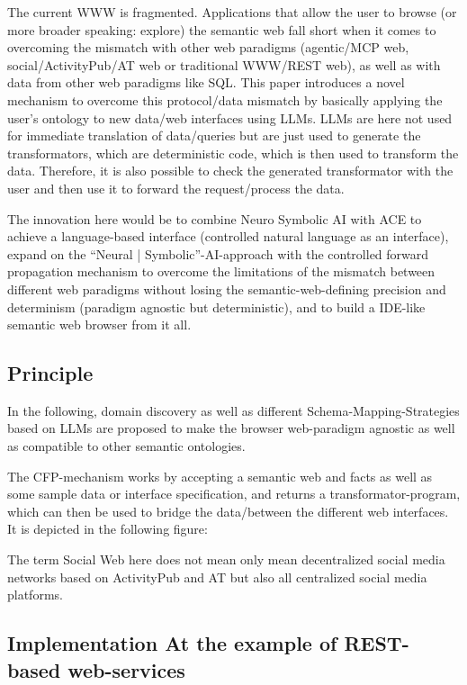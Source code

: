 \documentclass[12pt,a4paper]{article}
\begin{document}
The current WWW is fragmented. Applications that allow the user to browse (or more broader speaking: explore) the semantic web fall short when it comes to overcoming the mismatch with other web paradigms (agentic/MCP web, social/ActivityPub/AT web or traditional WWW/REST web), as well as with data from other web paradigms like SQL. This paper introduces a novel mechanism to overcome this protocol/data mismatch by basically applying the user's ontology to new data/web interfaces using LLMs. LLMs are here not used for immediate translation of data/queries but are just used to generate the transformators, which are deterministic code, which is then used to transform the data. Therefore, it is also possible to check the generated transformator with the user and then use it to forward the request/process the data.

The innovation here would be to combine Neuro Symbolic AI with ACE to achieve a language-based interface (controlled natural language as an interface), expand on the ``Neural | Symbolic''-AI-approach with the controlled forward propagation mechanism to overcome the limitations of the mismatch between different web paradigms without losing the semantic-web-defining precision and determinism (paradigm agnostic but deterministic), and to build a IDE-like semantic web browser from it all.

\subsection{Principle}

In the following, domain discovery as well as different Schema-Mapping-Strategies based on LLMs are proposed to make the browser web-paradigm agnostic as well as compatible to other semantic ontologies.

The CFP-mechanism works by accepting a semantic web and facts as well as some sample data or interface specification, and returns a transformator-program, which can then be used to bridge the data/between the different web interfaces. It is depicted in the following figure:

The term Social Web here does not mean only mean decentralized social media networks based on ActivityPub and AT but also all centralized social media platforms.

\subsection{Implementation At the example of REST-based web-services}
\end{document}
